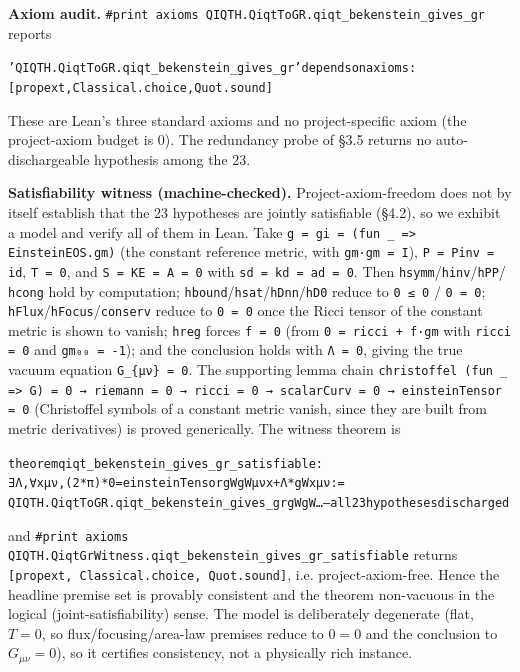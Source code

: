 \documentclass[11pt]{article}
\begin{document}
\textbf{Axiom audit.} \texttt{\#print axioms QIQTH.QiqtToGR.qiqt\_bekenstein\_gives\_gr} reports

{\footnotesize\begin{alltt}
'QIQTH.QiqtToGR.qiqt_bekenstein_gives_gr' depends on axioms: [propext, Classical.choice, Quot.sound]
\end{alltt}}

These are Lean's three standard axioms and no project-specific axiom (the project-axiom budget is 0). The
redundancy probe of §3.5 returns no auto-dischargeable hypothesis among the 23.

\textbf{Satisfiability witness (machine-checked).} Project-axiom-freedom does not by itself establish that
the 23 hypotheses are jointly satisfiable (§4.2), so we exhibit a model and verify all of them in
Lean. Take \texttt{g = gi = (fun \_ => EinsteinEOS.gm)} (the constant reference metric, with \texttt{gm·gm = I}),
\texttt{P = Pinv = id}, \texttt{T = 0}, and \texttt{S = KE = A = 0} with \texttt{sd = kd = ad = 0}. Then \texttt{hsymm}/\texttt{hinv}/\texttt{hPP}/
\texttt{hcong} hold by computation; \texttt{hbound}/\texttt{hsat}/\texttt{hDnn}/\texttt{hD0} reduce to \texttt{0 ≤ 0} / \texttt{0 = 0};
\texttt{hFlux}/\texttt{hFocus}/\texttt{conserv} reduce to \texttt{0 = 0} once the Ricci tensor of the constant metric is shown to
vanish; \texttt{hreg} forces \texttt{f = 0} (from \texttt{0 = ricci + f·gm} with \texttt{ricci = 0} and \texttt{gm₀₀ = -1}); and the
conclusion holds with \texttt{Λ = 0}, giving the true vacuum equation \texttt{G\_\{μν\} = 0}. The supporting lemma
chain \texttt{christoffel (fun \_ => G) = 0 → riemann = 0 → ricci = 0 → scalarCurv = 0 → einsteinTensor = 0}
(Christoffel symbols of a constant metric vanish, since they are built from metric derivatives) is
proved generically. The witness theorem is

{\footnotesize\begin{alltt}
theorem qiqt_bekenstein_gives_gr_satisfiable :
    ∃ Λ, ∀ x μ ν, (2*π) * 0 = einsteinTensor gW gW μ ν x + Λ * gW x μ ν :=
  QIQTH.QiqtToGR.qiqt_bekenstein_gives_gr gW gW … -- all 23 hypotheses discharged
\end{alltt}}

and \texttt{\#print axioms QIQTH.QiqtGrWitness.qiqt\_bekenstein\_gives\_gr\_satisfiable} returns
\texttt{[propext, Classical.choice, Quot.sound]}, i.e. project-axiom-free. Hence the headline premise set is
provably consistent and the theorem non-vacuous in the logical (joint-satisfiability) sense. The
model is deliberately degenerate (flat, $T=0$, so flux/focusing/area-law premises reduce to $0=0$
and the conclusion to $G_{\mu\nu}=0$), so it certifies consistency, not a physically rich instance.
\end{document}
